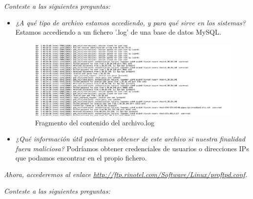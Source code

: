 \documentclass[12pt]{book}
\begin{document}
\textit{Conteste a las siguientes preguntas:}

\begin{itemize}
    \item \textit{¿A qué tipo de archivo estamos accediendo, y para qué sirve en los sistemas?}
    \newline
    Estamos accediendo a un fichero '.log' de una base de datos MySQL.
    \begin{figure}[h]
        \centering
        \includegraphics[width=\linewidth]{Practica 3y4/images/Screenshot 2024-10-24 at 09.15.20.png}
        \caption{Fragmento del contenido del archivo.log}
        \label{fig:enter-label}
    \end{figure}
    \item \textit{¿Qué información útil podríamos obtener de este archivo si nuestra finalidad fuera maliciosa?}
    \newline
    Podríamos obtener credenciales de usuarios o direcciones IPs que podamos encontrar en el propio fichero.
\end{itemize}

\textit{Ahora, accederemos al enlace \url{http://ftp.rinotel.com/Software/Linux/proftpd.conf}.}

\textit{Conteste a las siguientes preguntas:}
\end{document}
